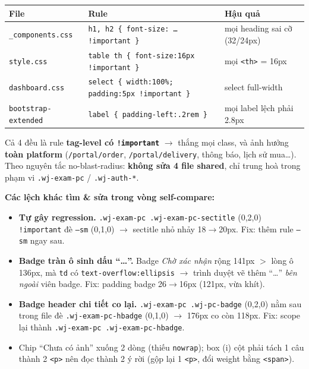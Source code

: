 \begin{center}
\begin{tabular}{lll}
\hline
\textbf{File} & \textbf{Rule} & \textbf{Hậu quả} \\
\hline
\texttt{\_components.css} & \texttt{h1, h2 \{ font-size: … !important \}} & mọi heading sai cỡ (32/24px) \\
\texttt{style.css} & \texttt{table th \{ font-size:16px !important \}} & mọi \texttt{<th>} = 16px \\
\texttt{dashboard.css} & \texttt{select \{ width:100\%; padding:5px !important \}} & select full-width \\
\texttt{bootstrap-extended} & \texttt{label \{ padding-left:.2rem \}} & mọi label lệch phải 2.8px \\
\hline
\end{tabular}
\end{center}

Cả 4 đều là rule \textbf{tag-level có \texttt{!important}} $\to$ thắng mọi class, và ảnh hưởng
\textbf{toàn platform} (\texttt{/portal/order}, \texttt{/portal/delivery}, thông báo, lịch sử mua…).
Theo nguyên tắc no-blast-radius: \textbf{không sửa 4 file shared}, chỉ trung hoà trong phạm vi
\texttt{.wj-exam-pc} / \texttt{.wj-auth-*}.

\textbf{Các lệch khác tìm \& sửa trong vòng self-compare:}
\begin{itemize}
  \item \textbf{Tự gây regression.} \texttt{.wj-exam-pc .wj-exam-pc-sectitle} (0,2,0) \texttt{!important}
    đè \texttt{--sm} (0,1,0) $\to$ sectitle nhỏ nhảy 18$\to$20px. Fix: thêm rule \texttt{--sm} ngay sau.
  \item \textbf{Badge tràn ô sinh dấu ``\ldots''.} Badge \emph{Chờ xác nhận} rộng 141px $>$ lòng ô 136px,
    mà \texttt{td} có \texttt{text-overflow:ellipsis} $\to$ trình duyệt vẽ thêm ``\ldots'' \emph{bên ngoài}
    viên badge. Fix: padding badge 26$\to$16px (121px, vừa khít).
  \item \textbf{Badge header chi tiết co lại.} \texttt{.wj-exam-pc .wj-pc-badge} (0,2,0) nằm sau trong file
    đè \texttt{.wj-exam-pc-hbadge} (0,1,0) $\to$ 176px co còn 118px. Fix: scope lại thành
    \texttt{.wj-exam-pc .wj-exam-pc-hbadge}.
  \item Chip ``Chưa có ảnh'' xuống 2 dòng (thiếu \texttt{nowrap}); box (i) cột phải tách 1 câu thành 2
    \texttt{<p>} nên đọc thành 2 ý rời (gộp lại 1 \texttt{<p>}, đổi weight bằng \texttt{<span>}).
\end{itemize}

